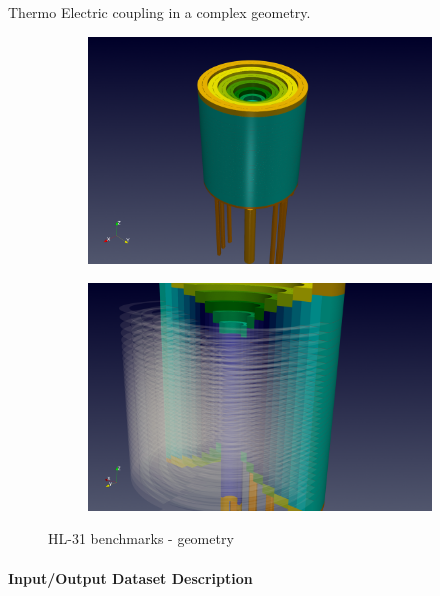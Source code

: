 Thermo Electric coupling in a complex geometry.

\begin{figure}[h]
  \centering
  \begin{subfigure}[c]{0.49\textwidth}
    \centering
    \includegraphics[width=\textwidth]{graphics/feelpp/feelpp-benchmark-HL-31-geo.png}
  \end{subfigure}
  \hfill
  \begin{subfigure}[c]{0.49\textwidth}
    \centering
    \includegraphics[width=\textwidth]{graphics/feelpp/feelpp-benchmark-HL-31-geo-zoom.png}
  \end{subfigure}
  \caption{HL-31 benchmarks - geometry}
  \label{fig:wp1:feelpp:hl-31:visualization-geometry}
\end{figure}


\paragraph{Input/Output Dataset Description}

